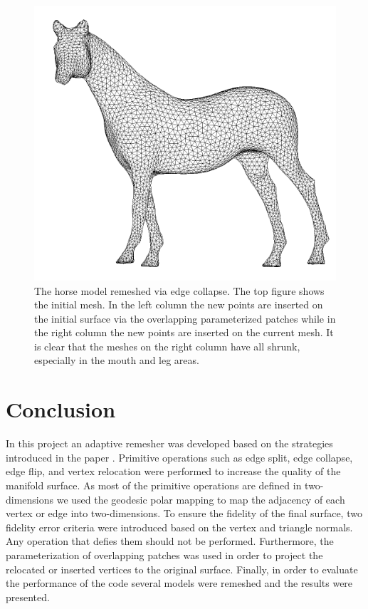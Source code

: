 \documentclass[letter,11pt]{article}
\begin{document}
\begin{figure}
\begin{minipage}{0.40\textwidth}
    \centering
    \includegraphics[width=1\linewidth]{../image/horse_d.png}
  \end{minipage}
  \caption{The horse model remeshed via edge collapse. The top figure
    shows the initial mesh. In the left column the new points are
    inserted on the initial surface via the overlapping parameterized
    patches while in the right column the new points are inserted on
    the current mesh. It is clear that the meshes on the right column
    have all shrunk, especially in the mouth and leg areas.}
  \label{fig:col_meshes}
\end{figure}


\section*{Conclusion}

In this project an adaptive remesher was developed based on the
strategies introduced in the paper \cite{explicit}. Primitive
operations such as edge split, edge collapse, edge flip, and vertex
relocation were performed to increase the quality of the manifold
surface.  As most of the primitive operations are defined in
two-dimensions we used the geodesic polar mapping to map the adjacency
of each vertex or edge into two-dimensions. To ensure the fidelity of
the final surface, two fidelity error criteria were introduced based
on the vertex and triangle normals. Any operation that defies them
should not be performed. Furthermore, the parameterization of
overlapping patches was used in order to project the relocated or
inserted vertices to the original surface. Finally, in order to
evaluate the performance of the code several models were remeshed and
the results were presented.
\end{document}
